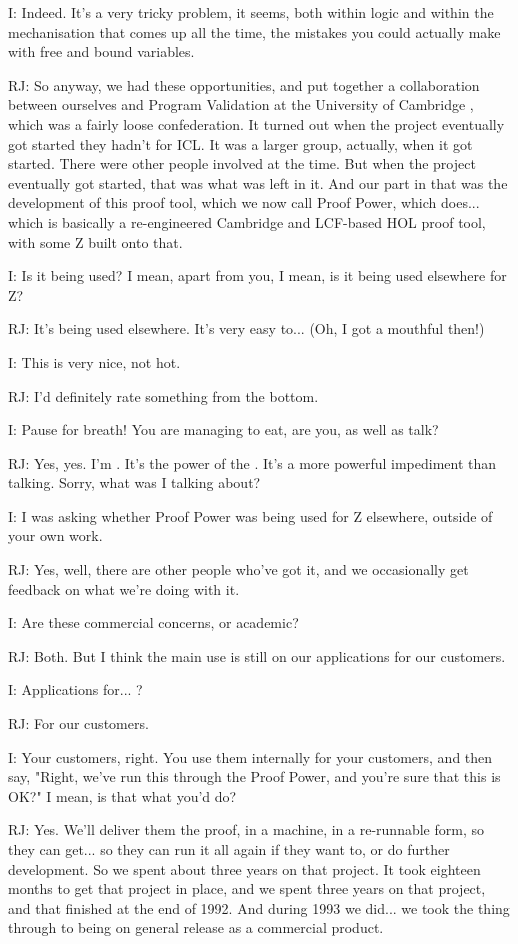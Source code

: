 \documentclass[10pt,titlepage]{book}
\begin{document}
I: Indeed. It's a very tricky problem, it seems, both within logic and within the mechanisation that comes up all the time, the mistakes you could actually make with free and bound variables.

RJ: So anyway, we had these opportunities, and put together a collaboration between ourselves and Program Validation at the University of Cambridge	, which was a fairly loose confederation. It turned out when the project eventually got started they hadn't 	for ICL. It was a larger group, actually, when it got started. There were other people involved at the time. But when the project eventually got started, that was what was left in it. And our part in that was the development of this proof tool, which we now call Proof Power, which does... which is basically a re-engineered Cambridge and LCF-based HOL proof tool, with some Z built onto that.

I: Is it being used? I mean, apart from you, I mean, is it being used elsewhere for Z?

RJ: It's being used elsewhere. It's very easy to... (Oh, I got a mouthful then!)

I: This is very nice, not hot.

RJ: I'd definitely rate something from the bottom.

I: Pause for breath! You are managing to eat, are you, as well as talk?

RJ: Yes, yes. I'm	. It's the power of the	. It's a more powerful impediment than talking. Sorry, what was I talking about?

I: I was asking whether Proof Power was being used for Z elsewhere, outside of your own work.

RJ: Yes, well, there are other people who've got it, and we occasionally get feedback on what we're doing with it.

I: Are these commercial concerns, or academic?

RJ: Both. But I think the main use is still on our applications for our customers.

I: Applications for... ?

RJ: For our customers.

I: Your customers, right. You use them internally for your customers, and then say, "Right, we've run this through the Proof Power, and you're sure that this is OK?" I mean, is that what you'd do?

RJ: Yes. We'll deliver them the proof, in a machine, in a re-runnable form, so they can get... so they can run it all again if they want to, or do further development. So we spent about three years on that project. It took eighteen months to get that project in place, and we spent three years on that project, and that finished at the end of 1992. And during 1993 we did... we took the thing through to being on general release as a commercial product.
\end{document}
